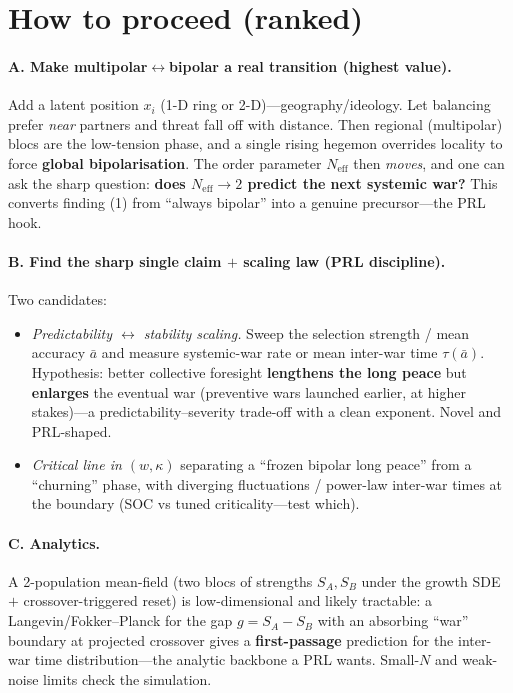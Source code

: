 \documentclass[11pt]{article}
\newcommand{\Neff}{N_{\mathrm{eff}}}
\newcommand{\abar}{\bar a}
\begin{document}
\section{How to proceed (ranked)}

\paragraph{A. Make multipolar$\leftrightarrow$bipolar a real transition (highest
value).} Add a latent position $x_i$ (1-D ring or 2-D)---geography/ideology. Let
balancing prefer \emph{near} partners and threat fall off with distance. Then
regional (multipolar) blocs are the low-tension phase, and a single rising
hegemon overrides locality to force \textbf{global bipolarisation}. The order
parameter $\Neff$ then \emph{moves}, and one can ask the sharp question:
\textbf{does $\Neff\to 2$ predict the next systemic war?} This converts finding
(1) from ``always bipolar'' into a genuine precursor---the PRL hook.

\paragraph{B. Find the sharp single claim $+$ scaling law (PRL discipline).}
Two candidates:
\begin{itemize}
\item \emph{Predictability $\leftrightarrow$ stability scaling.} Sweep the
  selection strength / mean accuracy $\abar$ and measure systemic-war rate or
  mean inter-war time $\tau(\abar)$. Hypothesis: better collective foresight
  \textbf{lengthens the long peace} but \textbf{enlarges} the eventual war
  (preventive wars launched earlier, at higher stakes)---a
  predictability--severity trade-off with a clean exponent. Novel and PRL-shaped.
\item \emph{Critical line in $(w,\kappa)$} separating a ``frozen bipolar long
  peace'' from a ``churning'' phase, with diverging fluctuations / power-law
  inter-war times at the boundary (SOC vs tuned criticality---test which).
\end{itemize}

\paragraph{C. Analytics.} A 2-population mean-field (two blocs of strengths
$S_A,S_B$ under the growth SDE $+$ crossover-triggered reset) is
low-dimensional and likely tractable: a Langevin/Fokker--Planck for the gap
$g=S_A-S_B$ with an absorbing ``war'' boundary at projected crossover gives a
\textbf{first-passage} prediction for the inter-war time distribution---the
analytic backbone a PRL wants. Small-$N$ and weak-noise limits check the
simulation.
\end{document}
